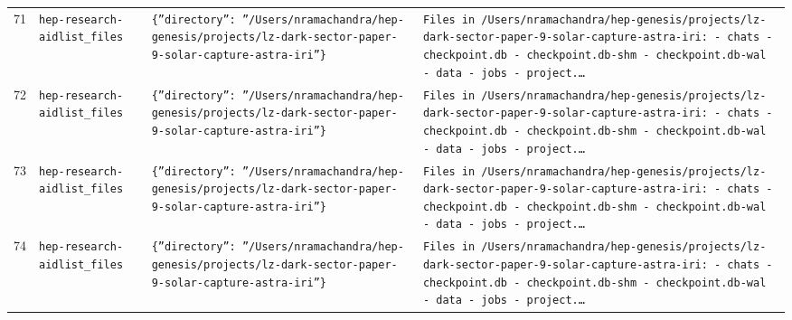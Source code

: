 \documentclass[11pt,a4paper]{article}
\begin{document}
\begin{longtable}{@{}p{}p{}p{}p{}@{}}
71 & \texttt{hep-research-aid}\newline\texttt{list\_\allowbreak{}files} & \texttt{\{''directory'':\allowbreak{} ''/\allowbreak{}Users/\allowbreak{}nramachandra/\allowbreak{}hep-genesis/\allowbreak{}projects/\allowbreak{}lz-dark-sector-paper-9-solar-capture-astra-iri''\}\allowbreak{}} & \texttt{Files in /\allowbreak{}Users/\allowbreak{}nramachandra/\allowbreak{}hep-genesis/\allowbreak{}projects/\allowbreak{}lz-dark-sector-paper-9-solar-capture-astra-iri:\allowbreak{}   - chats   - checkpoint.db   - checkpoint.db-shm   - checkpoint.db-wal   - data   - jobs   - project.\ldots{}\allowbreak{}} \\
72 & \texttt{hep-research-aid}\newline\texttt{list\_\allowbreak{}files} & \texttt{\{''directory'':\allowbreak{} ''/\allowbreak{}Users/\allowbreak{}nramachandra/\allowbreak{}hep-genesis/\allowbreak{}projects/\allowbreak{}lz-dark-sector-paper-9-solar-capture-astra-iri''\}\allowbreak{}} & \texttt{Files in /\allowbreak{}Users/\allowbreak{}nramachandra/\allowbreak{}hep-genesis/\allowbreak{}projects/\allowbreak{}lz-dark-sector-paper-9-solar-capture-astra-iri:\allowbreak{}   - chats   - checkpoint.db   - checkpoint.db-shm   - checkpoint.db-wal   - data   - jobs   - project.\ldots{}\allowbreak{}} \\
73 & \texttt{hep-research-aid}\newline\texttt{list\_\allowbreak{}files} & \texttt{\{''directory'':\allowbreak{} ''/\allowbreak{}Users/\allowbreak{}nramachandra/\allowbreak{}hep-genesis/\allowbreak{}projects/\allowbreak{}lz-dark-sector-paper-9-solar-capture-astra-iri''\}\allowbreak{}} & \texttt{Files in /\allowbreak{}Users/\allowbreak{}nramachandra/\allowbreak{}hep-genesis/\allowbreak{}projects/\allowbreak{}lz-dark-sector-paper-9-solar-capture-astra-iri:\allowbreak{}   - chats   - checkpoint.db   - checkpoint.db-shm   - checkpoint.db-wal   - data   - jobs   - project.\ldots{}\allowbreak{}} \\
74 & \texttt{hep-research-aid}\newline\texttt{list\_\allowbreak{}files} & \texttt{\{''directory'':\allowbreak{} ''/\allowbreak{}Users/\allowbreak{}nramachandra/\allowbreak{}hep-genesis/\allowbreak{}projects/\allowbreak{}lz-dark-sector-paper-9-solar-capture-astra-iri''\}\allowbreak{}} & \texttt{Files in /\allowbreak{}Users/\allowbreak{}nramachandra/\allowbreak{}hep-genesis/\allowbreak{}projects/\allowbreak{}lz-dark-sector-paper-9-solar-capture-astra-iri:\allowbreak{}   - chats   - checkpoint.db   - checkpoint.db-shm   - checkpoint.db-wal   - data   - jobs   - project.\ldots{}\allowbreak{}} \\

\end{longtable}
\end{document}
